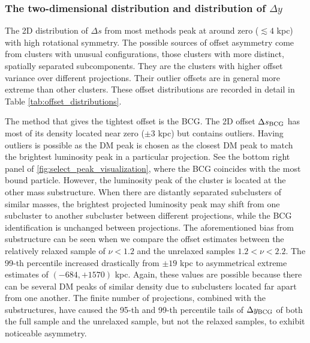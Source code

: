 \subsubsection{The two-dimensional distribution and distribution of $\Delta y$}
The 2D distribution of $\Delta s$ from most methods peak at
around zero ($\lesssim 4$ kpc) with high rotational symmetry. 
The possible sources of offset asymmetry come from clusters with unusual configurations,
those clusters with more distinct, spatially separated subcomponents.
They are the clusters with higher offset variance over different projections. 
Their outlier offsets are in general more extreme than other clusters.
These offset distributions are recorded in detail in Table
\ref{tab:offset_distributions}. 

The method that gives the tightest offset is the BCG. 
The 2D offset $\Delta s_{\rm BCG}$ has most of its density located near zero
($\pm 3$ kpc) but 
contains outliers. Having outliers is possible 
as the DM peak is chosen as the closest DM peak to match the
brightest luminosity peak in a particular projection.
See the bottom right panel of \ref{fig:select_peak_visualization}, where the BCG 
coincides with the most bound particle. However, the luminosity peak of the
cluster is located at the other mass substructure. 
When there are distantly separated subclusters of similar masses, 
the brightest projected luminosity peak 
may shift from one subcluster to another subcluster between different projections,
while the BCG identification is unchanged between projections.
The aforementioned bias from substructure can be seen when we compare the
offset estimates between the relatively relaxed sample of $\nu < 1.2$ and the
unrelaxed samples $1.2 < \nu < 2.2$. The 99-th percentile increased drastically
from $\pm 19$ kpc to asymmetrical extreme estimates of $(-684, +1570)$ kpc.
Again, these values are possible because there can be several DM peaks of
similar density due to subclusters located far apart from one another.
The finite number of projections, combined with the substructures, have caused 
the 95-th and 99-th percentile tails of $\Delta y_{\rm BCG}$ of both the full
sample and the unrelaxed sample, but not the relaxed samples, to exhibit 
noticeable asymmetry.

